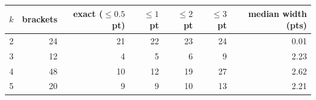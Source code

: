 \begin{tabular}{crrrrrr}
\toprule
$k$ & brackets & exact ($\le0.5$ pt) & $\le1$ pt & $\le2$ pt & $\le3$ pt & median width (pts) \\
\midrule
2 & 24 & 21 & 22 & 23 & 24 & 0.01 \\
3 & 12 & 4 & 5 & 6 & 9 & 2.23 \\
4 & 48 & 10 & 12 & 19 & 27 & 2.62 \\
5 & 20 & 9 & 9 & 10 & 13 & 2.21 \\
\bottomrule
\end{tabular}
